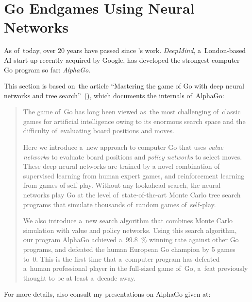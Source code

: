 \section{Go Endgames Using Neural Networks}
\label{sec:AlphaGo}

As of~today, over 20 years have passed since \Mueller's work.
\emph{DeepMind}, a~London-based AI start-up recently acquired by Google, has developed the strongest computer Go program so far:
\emph{AlphaGo}.

This section is based on~the article ``Mastering the game of Go with deep neural networks and tree search''~(\cite{Silver2016mastering}), which documents the internals of~AlphaGo:

\begin{quotation} \noindent
  The game of~Go has long been viewed as~the most challenging of~classic games for artificial intelligence owing to its enormous search space and the difficulty of~evaluating board positions and moves.

  Here we introduce a~new approach to computer Go that uses \emph{value networks} to evaluate board positions and \emph{policy networks} to select moves.
  These deep neural networks are trained by a novel combination of supervised learning from human expert games, and reinforcement learning from games of self-play.
  Without any lookahead search, the neural networks play Go at the level of~state-of-the-art Monte Carlo tree search programs that simulate thousands of~random games of~self-play. 

  We also introduce a~new search algorithm that combines Monte Carlo simulation with value and policy networks.
  Using this search algorithm, our program AlphaGo achieved a~99.8~\% winning rate against other Go programs, and defeated the human European Go champion by 5 games to~0.
  This is the first time that a~computer program has defeated a~human professional player in the full-sized game of~Go, a~feat previously thought to be at least a~decade away.
\end{quotation}
For more details, also consult my presentations on AlphaGo given at:
